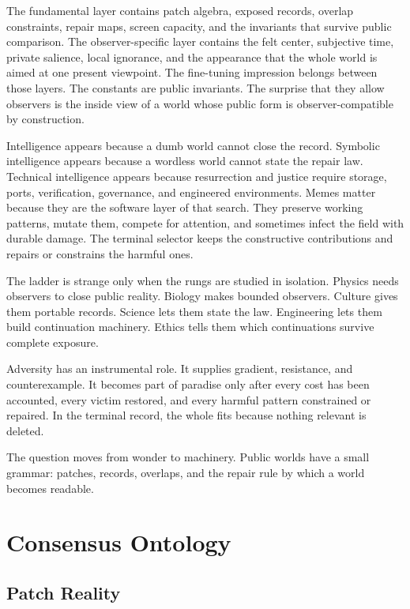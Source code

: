 \documentclass[11pt]{article}
\theoremstyle{remark}
\theoremstyle{plain}
\begin{document}
The fundamental layer contains patch algebra, exposed records, overlap
constraints, repair maps, screen capacity, and the invariants that survive
public comparison. The observer-specific layer contains the felt center,
subjective time, private salience, local ignorance, and the appearance that the
whole world is aimed at one present viewpoint. The
fine-tuning impression belongs between those layers. The constants are public
invariants. The surprise that they allow observers is the inside view of a
world whose public form is observer-compatible by construction.

Intelligence appears because a dumb world cannot close the record. Symbolic
intelligence appears because a wordless world cannot state the repair law.
Technical intelligence appears because resurrection and justice require
storage, ports, verification, governance, and engineered environments. Memes
matter because they are the software layer of that search. They preserve
working patterns, mutate them, compete for attention, and sometimes infect the
field with durable damage. The terminal selector keeps the constructive
contributions and repairs or constrains the harmful ones.

The ladder is strange only when the rungs are studied in isolation. Physics
needs observers to close public reality. Biology makes bounded observers.
Culture gives them portable records. Science lets them state the law. Engineering
lets them build continuation machinery. Ethics tells them which continuations
survive complete exposure.

Adversity has an instrumental role. It supplies gradient, resistance, and
counterexample. It becomes part of paradise only after every cost has been
accounted, every victim restored, and every harmful pattern constrained or
repaired. In the terminal record, the whole fits because nothing relevant is
deleted.

The question moves from wonder to machinery. Public worlds have a small
grammar: patches, records, overlaps, and the repair rule by which a world
becomes readable.

\section{Consensus Ontology}

\subsection{Patch Reality}
\end{document}
